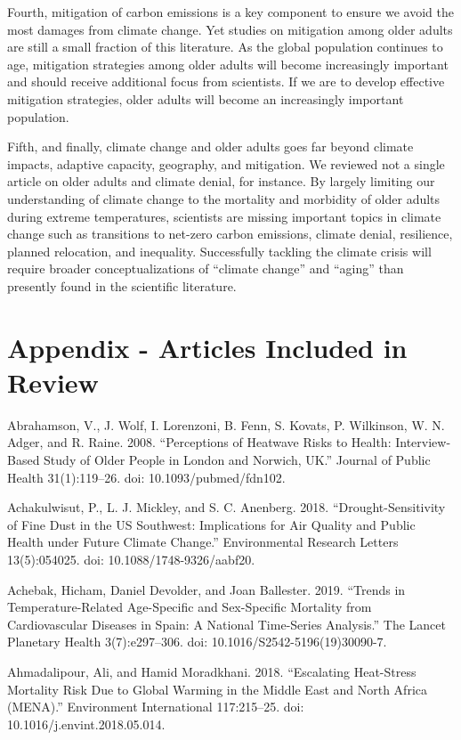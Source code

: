 \documentclass[12pt]{article}
\begin{document}
Fourth, mitigation of carbon emissions is a key component to ensure we
avoid the most damages from climate change. Yet studies on mitigation
among older adults are still a small fraction of this literature. As the
global population continues to age, mitigation strategies among older
adults will become increasingly important and should receive additional
focus from scientists. If we are to develop effective mitigation
strategies, older adults will become an increasingly important
population.

Fifth, and finally, climate change and older adults goes far beyond
climate impacts, adaptive capacity, geography, and mitigation. We
reviewed not a single article on older adults and climate denial, for
instance. By largely limiting our understanding of climate change to the
mortality and morbidity of older adults during extreme temperatures,
scientists are missing important topics in climate change such as
transitions to net-zero carbon emissions, climate denial, resilience,
planned relocation, and inequality. Successfully tackling the climate
crisis will require broader conceptualizations of ``climate change'' and
``aging'' than presently found in the scientific literature.

\hypertarget{appendix---articles-included-in-review}{%
\section{Appendix - Articles Included in
Review}\label{appendix---articles-included-in-review}}

Abrahamson, V., J. Wolf, I. Lorenzoni, B. Fenn, S. Kovats, P. Wilkinson,
W. N. Adger, and R. Raine. 2008. ``Perceptions of Heatwave Risks to
Health: Interview-Based Study of Older People in London and Norwich,
UK.'' Journal of Public Health 31(1):119--26. doi:
10.1093/pubmed/fdn102.

Achakulwisut, P., L. J. Mickley, and S. C. Anenberg. 2018.
``Drought-Sensitivity of Fine Dust in the US Southwest: Implications for
Air Quality and Public Health under Future Climate Change.''
Environmental Research Letters 13(5):054025. doi:
10.1088/1748-9326/aabf20.

Achebak, Hicham, Daniel Devolder, and Joan Ballester. 2019. ``Trends in
Temperature-Related Age-Specific and Sex-Specific Mortality from
Cardiovascular Diseases in Spain: A National Time-Series Analysis.'' The
Lancet Planetary Health 3(7):e297--306. doi:
10.1016/S2542-5196(19)30090-7.

Ahmadalipour, Ali, and Hamid Moradkhani. 2018. ``Escalating Heat-Stress
Mortality Risk Due to Global Warming in the Middle East and North Africa
(MENA).'' Environment International 117:215--25. doi:
10.1016/j.envint.2018.05.014.
\end{document}
